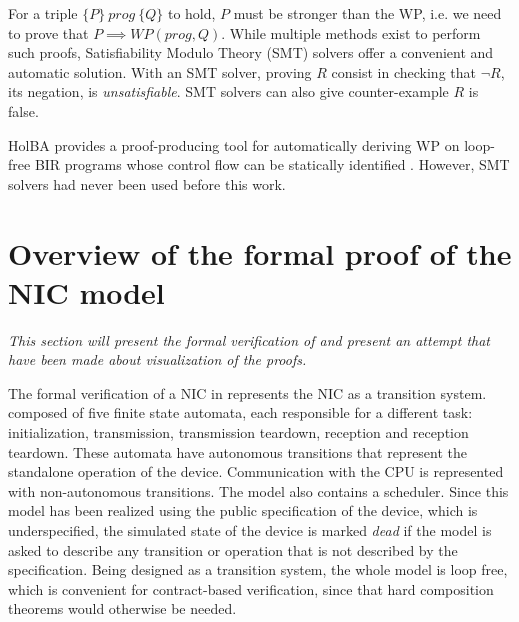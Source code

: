 \documentclass[10pt,a4paper]{article}
\newcommand{\htriple}[3]{\ensuremath{\{#1\}~#2~\{#3\}}}
\newcommand{\WP}{\ensuremath{\mathit{WP}}}
\begin{document}
\begin{multicols}{2}
For a triple \htriple{P}{prog}{Q} to hold, $P$ must be stronger than the WP, i.e. we need to prove that $P \implies \WP(prog, Q)$. While multiple methods exist to perform such proofs, Satisfiability Modulo Theory ({SMT}) solvers offer a convenient and automatic solution. With an SMT solver, proving $R$ consist in checking that $\neg R$, its negation, is \textit{unsatisfiable}. SMT solvers can also give counter-example $R$ is false.

{HolBA} provides a {proof-producing} tool for automatically deriving WP on loop-free {BIR} programs whose control flow can be statically identified \cite{lindner_trabin:_2019}. However, SMT solvers had never been used before this work.


\section{Overview of the formal proof of the NIC model} \label{overview-nic-proof}
\textit{This section will present the formal verification of \cite{haglund_formal_2016} and present an attempt that have been made about visualization of the proofs.}
\medskip

The formal verification of a NIC in \cite{haglund_formal_2016} represents the NIC as a transition system. composed of five finite state automata, each responsible for a different task: initialization, transmission, transmission teardown, reception and reception teardown. These automata have autonomous transitions that represent the standalone operation of the device. Communication with the CPU is represented with non-autonomous transitions. The model also contains a scheduler. Since this model has been realized using the public specification of the device, which is underspecified, the simulated state of the device is marked \textit{dead} if the model is asked to describe any transition or operation that is not described by the specification.
Being designed as a transition system, the whole model is loop free, which is convenient for contract-based verification, since that hard composition theorems would otherwise be needed.



\end{multicols}
\end{document}
